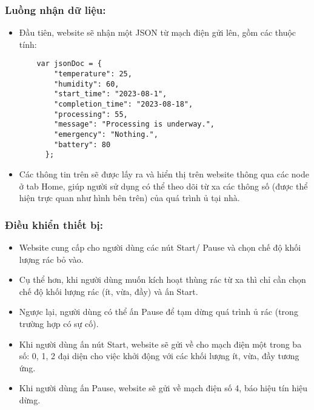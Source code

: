 \documentclass[12pt, a4paper]{article}
\begin{document}
\subsubsection{Luồng nhận dữ liệu:} 
        \begin{itemize}
            \item Đầu tiên, website sẽ nhận một JSON từ mạch điện gửi lên, gồm các thuộc tính:
            \begin{lstlisting}
    var jsonDoc = {
        "temperature": 25,
        "humidity": 60,
        "start_time": "2023-08-1",
        "completion_time": "2023-08-18",
        "processing": 55,
        "message": "Processing is underway.",
        "emergency": "Nothing.",
        "battery": 80
      };\end{lstlisting}
            \item Các thông tin trên sẽ được lấy ra và hiển thị trên website thông qua các node ở tab Home, giúp người sử dụng có thể theo dõi từ xa các thông số (được thể hiện trực quan như hình bên trên) của quá trình ủ tại nhà.
        \end{itemize}
        
\subsubsection{Điều khiển thiết bị:} 
        \begin{itemize}
            \item Website cung cấp cho người dùng các nút Start/ Pause và chọn chế độ khối lượng rác bỏ vào.
            \item Cụ thể hơn, khi người dùng muốn kích hoạt thùng rác từ xa thì chỉ cần chọn chế độ khối lượng rác (ít, vừa, đầy) và ấn Start. 
            \item Ngược lại, người dùng có thể ấn Pause để tạm dừng quá trình ủ rác (trong trường hợp có sự cố).
            \item Khi người dùng ấn nút Start, website sẽ gửi về cho mạch điện một trong ba số: 0, 1, 2 đại diện cho việc khởi động với các khối lượng ít, vừa, đầy tương ứng.
            \item Khi người dùng ấn Pause, website sẽ gửi về mạch điện số 4, báo hiệu tín hiệu dừng.
        \end{itemize}
\end{document}
